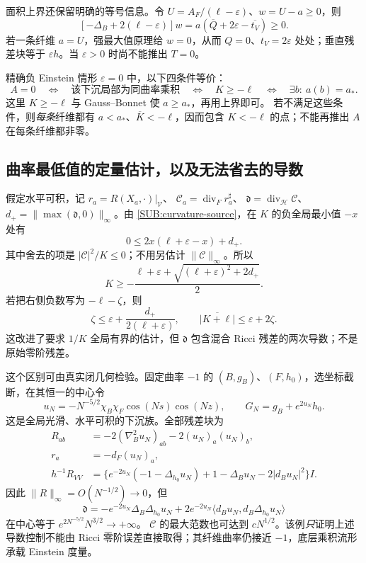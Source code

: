 \documentclass[UTF8,fontset=fandol,zihao=-4,oneside,openany]{ctexbook}
\theoremstyle{cjkplain}
\numberwithin{equation}{chapter}
\begin{document}
面积上界还保留明确的等号信息。令 $U=A_F/(\ell-\varepsilon)$、$w=U-a\ge0$，则
\begin{equation}\label{SUB:area-equality}
[-\Delta_B+2(\ell-\varepsilon)]w
=a(\overline Q+2\varepsilon-\overline{t_V})\ge0.
\end{equation}
若一条纤维 $a=U$，强最大值原理给 $w=0$，从而 $Q=0$、$t_V=2\varepsilon$ 处处；垂直残差块等于 $\varepsilon h$。当 $\varepsilon>0$ 时尚不能推出 $T=0$。

精确负 Einstein 情形 $\varepsilon=0$ 中，以下四条件等价：
\begin{equation}\label{SUB:area-equivalence}
A=0\quad\Longleftrightarrow\quad
\text{该下沉局部为同曲率乘积}
\quad\Longleftrightarrow\quad K\ge-\ell
\quad\Longleftrightarrow\quad\exists b:\ a(b)=a_*.
\end{equation}
这里 $K\ge-\ell$ 与 Gauss--Bonnet 使 $a\ge a_*$，再用上界即可。
若不满足这些条件，则\emph{每条}纤维都有 $a<a_*$、$\overline K<-\ell$，因而包含 $K<-\ell$ 的点；不能再推出 $A$ 在每条纤维都非零。

\subsection{曲率最低值的定量估计，以及无法省去的导数}

假定水平可积，记 $r_a=R(X_a,\cdot)|_{\mathcal V}$、
$\mathcal C_a=\operatorname{div}_F r_a^\sharp$、
$\mathfrak d=\operatorname{div}_{\mathcal H}\mathcal C$、
$d_+=\|\max(\mathfrak d,0)\|_\infty$。由 \eqref{SUB:curvature-source}，在 $K$ 的负全局最小值 $-x$ 处有
\[
0\le2x(\ell+\varepsilon-x)+d_+.
\]
其中舍去的项是 $|\mathcal C|^2/K\le0$；不用另估计 $\|\mathcal C\|_\infty$。所以
\begin{equation}\label{SUB:K-lower}
K\ge-\frac{\ell+\varepsilon+
\sqrt{(\ell+\varepsilon)^2+2d_+}}2.
\end{equation}
若把右侧负数写为 $-\ell-\zeta$，则
\[
\zeta\le\varepsilon+\frac{d_+}{2(\ell+\varepsilon)},\qquad
\overline{|K+\ell|}\le\varepsilon+2\zeta.
\]
这改进了要求 $1/K$ 全局有界的估计，但 $\mathfrak d$ 包含混合 Ricci 残差的两次导数；不是原始零阶残差。

这个区别可由真实闭几何检验。固定曲率 $-1$ 的 $(B,g_B)$、$(F,h_0)$，选坐标截断，在其恒一的中心令
\[
u_N=-N^{-5/2}\chi_B\chi_F\cos(Ns)\cos(Nz),\qquad
G_N=g_B+e^{2u_N}h_0.
\]
这是全局光滑、水平可积的下沉族。全部残差块为
\begin{equation}\label{SUB:conformal-high-frequency}
\begin{aligned}
R_{ab}&=-2(\nabla_B^2u_N)_{ab}-2(u_N)_a(u_N)_b,\\
r_a&=-d_F(u_N)_a,\\
h^{-1}R_{VV}
&=\{e^{-2u_N}(-1-\Delta_{h_0}u_N)+1
       -\Delta_Bu_N-2|d_Bu_N|^2\}I.
\end{aligned}
\end{equation}
因此 $\|R\|_\infty=O(N^{-1/2})\to0$，但
\[
\mathfrak d=-e^{-2u_N}\Delta_B\Delta_{h_0}u_N
+2e^{-2u_N}\langle d_Bu_N,d_B\Delta_{h_0}u_N\rangle
\]
在中心等于 $e^{2N^{-5/2}}N^{3/2}\to+\infty$。
$\mathcal C$ 的最大范数也可达到 $cN^{1/2}$。该例\emph{只}证明上述导数控制不能由 Ricci 零阶误差直接取得；其纤维曲率仍接近 $-1$，底层乘积流形承载 Einstein 度量。
\end{document}
